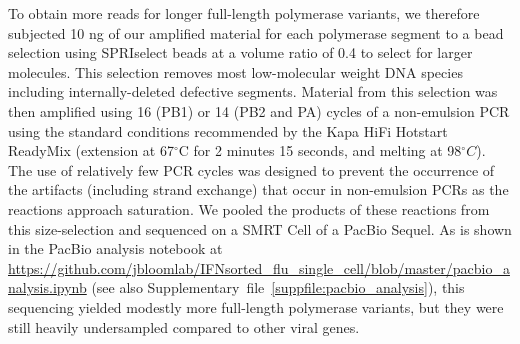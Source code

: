 \documentclass[9pt,lineno]{elife}
\begin{document}
To obtain more reads for longer full-length polymerase variants, we therefore subjected 10 ng of our amplified material for each polymerase segment to a bead selection using SPRIselect beads at a volume ratio of 0.4 to select for larger molecules. 
This selection removes most low-molecular weight DNA species including internally-deleted defective segments.
Material from this selection was then amplified using 16 (PB1) or 14 (PB2 and PA) cycles of a non-emulsion PCR using the standard conditions recommended by the Kapa HiFi Hotstart ReadyMix (extension at 67$^{\circ}$C for 2 minutes 15 seconds, and melting at 98$^{\circ}C$).
The use of relatively few PCR cycles was designed to prevent the occurrence of the artifacts (including strand exchange) that occur in non-emulsion PCRs as the reactions approach saturation.
We pooled the products of these reactions from this size-selection and sequenced on a SMRT Cell of a PacBio Sequel.
As is shown in the PacBio analysis notebook at \url{https://github.com/jbloomlab/IFNsorted_flu_single_cell/blob/master/pacbio_analysis.ipynb} (see also Supplementary~file~\ref{suppfile:pacbio_analysis}), this sequencing yielded modestly more full-length polymerase variants, but they were still heavily undersampled compared to other viral genes.
\end{document}
